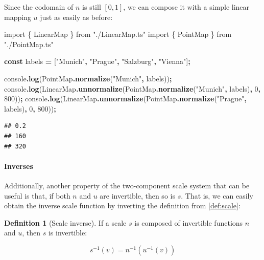 \documentclass[
]{book}
\newenvironment{Shaded}{\begin{snugshade}}{\end{snugshade}}
\newcommand{\BuiltInTok}[1]{#1}
\newcommand{\DecValTok}[1]{\textcolor[rgb]{0.00,0.00,0.81}{#1}}
\newcommand{\FunctionTok}[1]{\textcolor[rgb]{0.13,0.29,0.53}{\textbf{#1}}}
\newcommand{\ImportTok}[1]{#1}
\newcommand{\KeywordTok}[1]{\textcolor[rgb]{0.13,0.29,0.53}{\textbf{#1}}}
\newcommand{\NormalTok}[1]{#1}
\newcommand{\OperatorTok}[1]{\textcolor[rgb]{0.81,0.36,0.00}{\textbf{#1}}}
\newcommand{\StringTok}[1]{\textcolor[rgb]{0.31,0.60,0.02}{#1}}
\theoremstyle{definition}
\newtheorem{definition}{Definition}[chapter]
\theoremstyle{definition}
\theoremstyle{definition}
\theoremstyle{definition}
\theoremstyle{remark}
\begin{document}
Since the codomain of \(n\) is still \([0, 1]\), we can compose it with a simple linear mapping \(u\) just as easily as before:

\begin{Shaded}
\begin{Highlighting}[]
\ImportTok{import}\NormalTok{ \{ LinearMap \} }\ImportTok{from} \StringTok{"./LinearMap.ts"}
\ImportTok{import}\NormalTok{ \{ PointMap \} }\ImportTok{from} \StringTok{"./PointMap.ts"}

\KeywordTok{const}\NormalTok{ labels }\OperatorTok{=}\NormalTok{ [}\StringTok{"Munich"}\OperatorTok{,} \StringTok{"Prague"}\OperatorTok{,} \StringTok{"Salzburg"}\OperatorTok{,} \StringTok{"Vienna"}\NormalTok{]}\OperatorTok{;}

\BuiltInTok{console}\OperatorTok{.}\FunctionTok{log}\NormalTok{(PointMap}\OperatorTok{.}\FunctionTok{normalize}\NormalTok{(}\StringTok{"Munich"}\OperatorTok{,}\NormalTok{ labels))}\OperatorTok{;}
\BuiltInTok{console}\OperatorTok{.}\FunctionTok{log}\NormalTok{(LinearMap}\OperatorTok{.}\FunctionTok{unnormalize}\NormalTok{(PointMap}\OperatorTok{.}\FunctionTok{normalize}\NormalTok{(}\StringTok{"Munich"}\OperatorTok{,}\NormalTok{ labels)}\OperatorTok{,} \DecValTok{0}\OperatorTok{,} \DecValTok{800}\NormalTok{))}\OperatorTok{;}
\BuiltInTok{console}\OperatorTok{.}\FunctionTok{log}\NormalTok{(LinearMap}\OperatorTok{.}\FunctionTok{unnormalize}\NormalTok{(PointMap}\OperatorTok{.}\FunctionTok{normalize}\NormalTok{(}\StringTok{"Prague"}\OperatorTok{,}\NormalTok{ labels)}\OperatorTok{,} \DecValTok{0}\OperatorTok{,} \DecValTok{800}\NormalTok{))}\OperatorTok{;}
\end{Highlighting}
\end{Shaded}

\begin{verbatim}
## 0.2
## 160
## 320
\end{verbatim}

\paragraph{Inverses}\label{inverses-1}

Additionally, another property of the two-component scale system that can be useful is that, if both \(n\) and \(u\) are invertible, then so is \(s\). That is, we can easily obtain the inverse scale function by inverting the definition from \ref{def:scale}:

\begin{definition}[Scale inverse]
\protect\hypertarget{def:scale-inverse}{}\label{def:scale-inverse}If a scale \(s\) is composed of invertible functions \(n\) and \(u\), then \(s\) is invertible:

\[s^{-1}(v) = n^{-1}(u^{-1}(v))\]
\end{definition}
\end{document}
